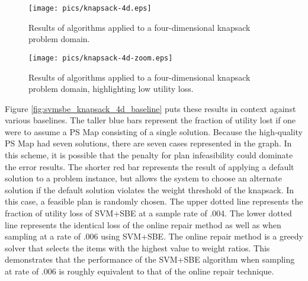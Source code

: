 
\begin{figure}
\begin{center}
\texttt{[image: pics/knapsack-4d.eps]}
\caption{Results of algorithms applied to a four-dimensional knapsack problem domain.}
\label{fig:knapsack-4d}
\end{center}
\end{figure}

\begin{figure}
\begin{center}
\texttt{[image: pics/knapsack-4d-zoom.eps]}
\caption{Results of algorithms applied to a four-dimensional knapsack problem domain, highlighting low utility loss.}
\label{fig:knapsack-4d-zoom}
\end{center}
\end{figure}


Figure \ref{fig:svmsbe_knapsack_4d_baseline} puts these results in context against various baselines.  The taller blue bars represent the fraction of utility lost if one were to assume a PS Map consisting of a single solution.  Because the high-quality PS Map had seven solutions, there are seven cases represented in the graph.  In this scheme, it is possible that the penalty for plan infeasibility could dominate the error results.  The shorter red bar represents the result of applying a default solution to a problem instance, but allows the system to choose an alternate solution if the default solution violates the weight threshold of the knapsack. In this case, a feasible plan is randomly chosen.  The upper dotted line represents the fraction of utility loss of SVM+SBE at a sample rate of .004.  The lower dotted line represents the identical loss of the online repair method as well as when sampling at a rate of .006 using SVM+SBE.  The online repair method is a greedy solver that selects the items with the highest value to weight ratios.  This demonstrates that the performance of the SVM+SBE algorithm when sampling at rate of .006 is roughly equivalent to that of the online repair technique.



